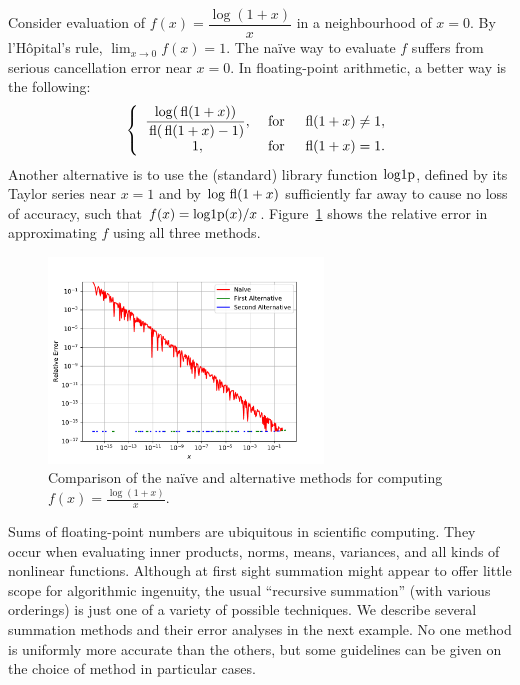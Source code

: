 \begin{example}
Consider evaluation of $f(x) = \dfrac{\log(1+x)}{x}$ in a neighbourhood of $x=0$. By l'H\^opital's rule, $\displaystyle\lim_{x\to0}f(x)=1$. The na\"ive way to evaluate $f$ suffers from serious cancellation error near $x=0$. In floating-point arithmetic, a better way is the following:
\[
\left\{ \begin{array}{ccc}
\dfrac{\log({\rm\,fl}(1+x))}{{\rm\,fl}({\rm\,fl}(1+x)-1)}, & \hbox{ for } & {\rm\,fl}(1+x)\ne 1,\\
1, & \hbox{ for } & {\rm\,fl}(1+x)=1.
\end{array}\right.
\]
Another alternative is to use the (standard) library function $\operatorname{log1p}$, defined by its Taylor series near $x=1$ and by $\log{\rm\,fl}(1+x)$ sufficiently far away to cause no loss of accuracy, such that $f(x) = \operatorname{log1p}(x)/x$. Figure~\ref{figure:log1pdx} shows the relative error in approximating $f$ using all three methods.
\begin{figure}[htbp]
\begin{center}
\includegraphics[width=0.65\textwidth]{log1pdx}
\caption{Comparison of the na\"ive and alternative methods for computing $f(x) = \frac{\log(1+x)}{x}$.}
\label{figure:log1pdx}
\end{center}
\end{figure}
\end{example}

Sums of floating-point numbers are ubiquitous in scientific computing. They occur when evaluating inner products, norms, means, variances, and all kinds of nonlinear functions. Although at first sight summation might appear to offer little scope for algorithmic ingenuity, the usual ``recursive summation'' (with various orderings) is just one of a variety of possible techniques. We describe several summation methods and their error analyses in the next example. No one method is uniformly more accurate than the others, but some guidelines can be given on the choice of method in particular cases.

